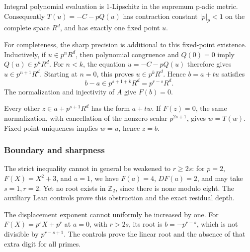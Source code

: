 Integral polynomial evaluation is 1-Lipschitz in the supremum p-adic
metric. Consequently \(T(u)=-C-pQ(u)\) has contraction constant
\(|p|_p<1\) on the complete space \(R^d\), and has exactly one fixed
point \(u\).

For completeness, the sharp precision is additional to this fixed-point
existence. Inductively, if \(u\in p^nR^d\), then polynomial congruence
and \(Q(0)=0\) imply \(Q(u)\in p^nR^d\). For \(n<k\), the equation
\(u=-C-pQ(u)\) therefore gives \(u\in p^{n+1}R^d\). Starting at \(n=0\),
this proves \(u\in p^kR^d\). Hence \(b=a+tu\) satisfies \[
b-a\in p^{s+1+k}R^d=p^{r-s}R^d.
\] The normalization and injectivity of \(A\) give \(F(b)=0\).

Every other \(z\in a+p^{s+1}R^d\) has the form \(a+tw\). If \(F(z)=0\),
the same normalization, with cancellation of the nonzero scalar
\(p^{2s+1}\), gives \(w=T(w)\). Fixed-point uniqueness implies \(w=u\),
hence \(z=b\).

\hypertarget{cont6:boundary-and-sharpness}{%
\subsubsection{Boundary and sharpness}\label{cont6:boundary-and-sharpness}}

The strict inequality cannot in general be weakened to \(r\ge2s\): for
\(p=2\), \(F(X)=X^2+3\), and \(a=1\), we have \(F(a)=4\), \(DF(a)=2\),
and may take \(s=1,r=2\). Yet no root exists in \(\mathbb Z_2\), since
there is none modulo eight. The auxiliary Lean controls prove this
obstruction and the exact residual depth.

The displacement exponent cannot uniformly be increased by one. For
\(F(X)=p^sX+p^r\) at \(a=0\), with \(r>2s\), its root is \(b=-p^{r-s}\),
which is not divisible by \(p^{r-s+1}\). The controls prove the linear
root and the absence of that extra digit for all primes.
